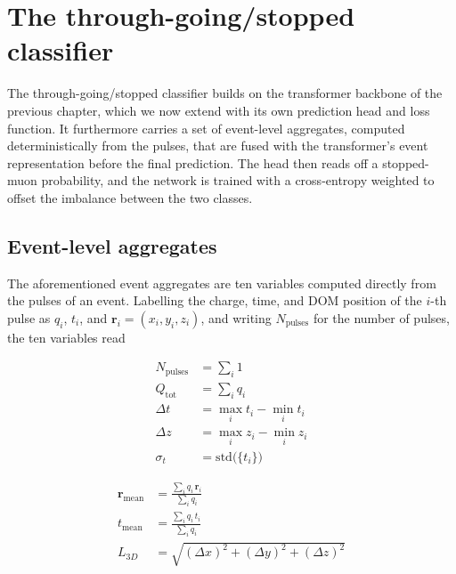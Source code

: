 \section{The through-going/stopped classifier}
\label{sec:classifier}

The through-going/stopped classifier builds on the transformer backbone of the previous chapter, which we now extend with its own prediction head and loss function. It furthermore carries a set of event-level aggregates, computed deterministically from the pulses, that are fused with the transformer's event representation before the final prediction. The head then reads off a stopped-muon probability, and the network is trained with a cross-entropy weighted to offset the imbalance between the two classes.

\subsection{Event-level aggregates}

The aforementioned event aggregates are ten variables computed directly from the pulses of an event. Labelling the charge, time, and DOM position of the $i$-th pulse as $q_i$, $t_i$, and $\mathbf{r}_i=(x_i,y_i,z_i)$, and writing $N_{\mathrm{pulses}}$ for the number of pulses, the ten variables read

\vspace{-10pt}
\begin{minipage}{0.47\textwidth}
\begin{align}
    N_{\mathrm{pulses}} &= \sum_i 1 \label{eq:nhits}\\
    Q_{\mathrm{tot}} &= \sum_i q_i \label{eq:qtot_cls}\\
    \Delta t &= \max_i t_i - \min_i t_i \label{eq:dt}\\
    \Delta z &= \max_i z_i - \min_i z_i \label{eq:dz}\\
    \sigma_t &= \mathrm{std}\bigl(\{t_i\}\bigr) \label{eq:tstd}
\end{align}
\end{minipage}
\hfill
\begin{minipage}{0.47\textwidth}
\begin{align}
    \mathbf{r}_{\mathrm{mean}} &= \frac{\sum_i q_i\,\mathbf{r}_i}{\sum_i q_i} \label{eq:rcw}\\
    t_{\mathrm{mean}} &= \frac{\sum_i q_i\,t_i}{\sum_i q_i} \label{eq:tcw}\\
    L_{3D} &= \sqrt{(\Delta x)^2 + (\Delta y)^2 + (\Delta z)^2} \label{eq:l3d}
\end{align}
\end{minipage}
\vspace{10pt}

